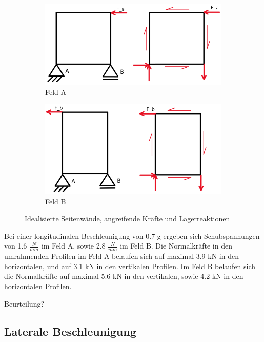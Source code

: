   \begin{figure}[!ht]
    \centering
      \begin{subfigure}[b]{0.5\textwidth}
         \includegraphics[width=1\linewidth]{04_Figures/1.2 Feld A}
         \caption{Feld A}
         \label{Feld A}
      \end{subfigure}
      \begin{subfigure}[b]{0.5\textwidth}
         \includegraphics[width=1\linewidth]{04_Figures/1.2 Feld B}
         \caption{Feld B}
         \label{Feld B}
      \end{subfigure}
    \caption{Idealisierte Seitenwände, angreifende Kräfte und Lagerreaktionen}
    \label{1.2 Felder}
  \end{figure}

  Bei einer longitudinalen Beschleunigung von 0.7 g ergeben sich Schubspannungen von 1.6 $\frac{N}{mm}$ im Feld A, sowie 2.8 $\frac{N}{mm}$ im Feld B. Die Normalkräfte in den umrahmenden Profilen im Feld A belaufen sich auf maximal 3.9 kN in den horizontalen, und auf 3.1 kN in den vertikalen Profilen. Im Feld B belaufen sich die Normalkräfte auf maximal 5.6 kN in den vertikalen, sowie 4.2 kN in den horizontalen Profilen.

  Beurteilung?

\subsection{Laterale Beschleunigung}
\label{1.4 Laterale Beschleunigung}
